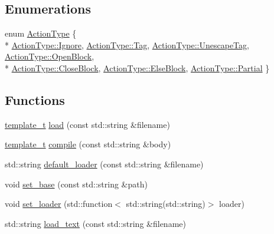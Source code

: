 \subsection*{Enumerations}
\begin{DoxyCompactItemize}
\item 
enum \hyperlink{namespacecrow_1_1mustache_aeb8da2ae9d8d9fe55f6ab0a7455dd667}{Action\-Type} \{ \\*
\hyperlink{namespacecrow_1_1mustache_aeb8da2ae9d8d9fe55f6ab0a7455dd667afd038fc7f319e48f3115d92bf5bdbef9}{Action\-Type\-::\-Ignore}, 
\hyperlink{namespacecrow_1_1mustache_aeb8da2ae9d8d9fe55f6ab0a7455dd667ac101058e7ea21bbbf2a5ac893088e90b}{Action\-Type\-::\-Tag}, 
\hyperlink{namespacecrow_1_1mustache_aeb8da2ae9d8d9fe55f6ab0a7455dd667a6a92aa81e0cd0b1c2f77a84226ad4777}{Action\-Type\-::\-Unescape\-Tag}, 
\hyperlink{namespacecrow_1_1mustache_aeb8da2ae9d8d9fe55f6ab0a7455dd667a047e46a0bc852354acb31de6a507a3fe}{Action\-Type\-::\-Open\-Block}, 
\\*
\hyperlink{namespacecrow_1_1mustache_aeb8da2ae9d8d9fe55f6ab0a7455dd667a470529d743a17635308c52dc50efccd8}{Action\-Type\-::\-Close\-Block}, 
\hyperlink{namespacecrow_1_1mustache_aeb8da2ae9d8d9fe55f6ab0a7455dd667ab82f53ea35520be1175d4764c22d2b30}{Action\-Type\-::\-Else\-Block}, 
\hyperlink{namespacecrow_1_1mustache_aeb8da2ae9d8d9fe55f6ab0a7455dd667a44ffd38a6dea695cbe2b34efdcc6cf27}{Action\-Type\-::\-Partial}
 \}
\end{DoxyCompactItemize}
\subsection*{Functions}
\begin{DoxyCompactItemize}
\item 
\hyperlink{classcrow_1_1mustache_1_1template__t}{template\-\_\-t} \hyperlink{namespacecrow_1_1mustache_abe44de50c382e0d39e7ef5b7d5057ca6}{load} (const std\-::string \&filename)
\item 
\hyperlink{classcrow_1_1mustache_1_1template__t}{template\-\_\-t} \hyperlink{namespacecrow_1_1mustache_a5823e2be647059121cc4f0329e44741a}{compile} (const std\-::string \&body)
\item 
std\-::string \hyperlink{namespacecrow_1_1mustache_a7e8660fbdeeb994a1f00c704b469c792}{default\-\_\-loader} (const std\-::string \&filename)
\item 
void \hyperlink{namespacecrow_1_1mustache_a88cf75099968de883a8e2bf14ce6d1cb}{set\-\_\-base} (const std\-::string \&path)
\item 
void \hyperlink{namespacecrow_1_1mustache_a064911bc597a2a849f008b50cdead53e}{set\-\_\-loader} (std\-::function$<$ std\-::string(std\-::string)$>$ loader)
\item 
std\-::string \hyperlink{namespacecrow_1_1mustache_a8db3aff497ff60b32321fc0a16274576}{load\-\_\-text} (const std\-::string \&filename)
\end{DoxyCompactItemize}


